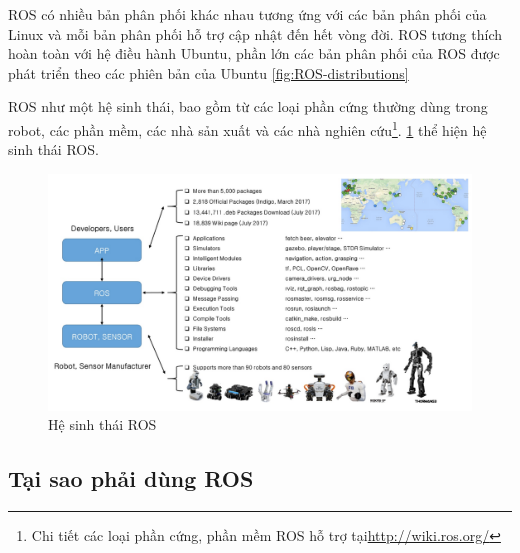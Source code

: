 ROS có nhiều bản phân phối khác nhau tương ứng với các bản phân phối của Linux và mỗi bản phân phối hỗ trợ cập nhật đến hết vòng đời. ROS tương thích hoàn toàn với hệ điều hành Ubuntu, phần lớn các bản phân phối của ROS được phát triển theo các phiên bản của Ubuntu \figurename{\ref{fig:ROS-distributions}}

ROS như một hệ sinh thái, bao gồm từ các loại phần cứng thường dùng trong robot, các phần mềm, các nhà sản xuất và các nhà nghiên cứu\footnote{Chi tiết các loại phần cứng, phần mềm ROS hỗ trợ tại\url{http://wiki.ros.org/}}. \figurename{\ref{fig:Ecosystem}} thể hiện hệ sinh thái ROS.

\begin{figure}[htbp]
	\centering
	\includegraphics[width=1\linewidth]{figures/Ecosystem.pdf}
	\caption{Hệ sinh thái ROS \cite{pyo2017ros}}
	\label{fig:Ecosystem}
\end{figure}

\subsection{Tại sao phải dùng ROS}

